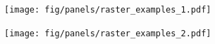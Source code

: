\documentclass[a4paper,12pt]{article}
\newcommand{\ssc}[3]{\ensuremath{#1_{\text{#2}_{\text{#3}}}}}
\newcommand{\gE      }{\ssc{g}      {\scriptsize{E}}{}}
\newcommand{\gI      }{\ssc{g}      {\scriptsize{I}}{}}
\begin{document}
{\begin{figure}[p]
    \centering
        \texttt{[image: fig/panels/raster\_examples\_1.pdf]}
\end{figure}

\setcounter{figure}{0}
\renewcommand{\figurename}{Figure 5 - figure supplement}

\begin{figure}[p]
    \centering
        \texttt{[image: fig/panels/raster\_examples\_2.pdf]}
    \caption{}
\end{figure}

\clearpage

%
%
}
\end{document}
